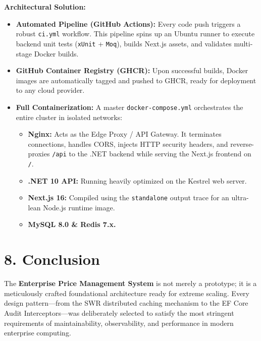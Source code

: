 \documentclass[12pt,a4paper]{article}
\begin{document}
\textbf{Architectural Solution:}
\begin{itemize}[label=\textbullet]
    \item \textbf{Automated Pipeline (GitHub Actions):} Every code push triggers a robust \texttt{ci.yml} workflow. This pipeline spins up an Ubuntu runner to execute backend unit tests (\texttt{xUnit} + \texttt{Moq}), builds Next.js assets, and validates multi-stage Docker builds.
    \item \textbf{GitHub Container Registry (GHCR):} Upon successful builds, Docker images are automatically tagged and pushed to GHCR, ready for deployment to any cloud provider.
    \item \textbf{Full Containerization:} A master \texttt{docker-compose.yml} orchestrates the entire cluster in isolated networks:
        \begin{itemize}[label=--]
            \item \textbf{Nginx:} Acts as the Edge Proxy / API Gateway. It terminates connections, handles CORS, injects HTTP security headers, and reverse-proxies \texttt{/api} to the .NET backend while serving the Next.js frontend on \texttt{/}.
            \item \textbf{.NET 10 API:} Running heavily optimized on the Kestrel web server.
            \item \textbf{Next.js 16:} Compiled using the \texttt{standalone} output trace for an ultra-lean Node.js runtime image.
            \item \textbf{MySQL 8.0 \& Redis 7.x.}
        \end{itemize}
\end{itemize}

\section{8. Conclusion}
The \textbf{Enterprise Price Management System} is not merely a prototype; it is a meticulously crafted foundational architecture ready for extreme scaling. Every design pattern—from the SWR distributed caching mechanism to the EF Core Audit Interceptors—was deliberately selected to satisfy the most stringent requirements of maintainability, observability, and performance in modern enterprise computing.
\end{document}
